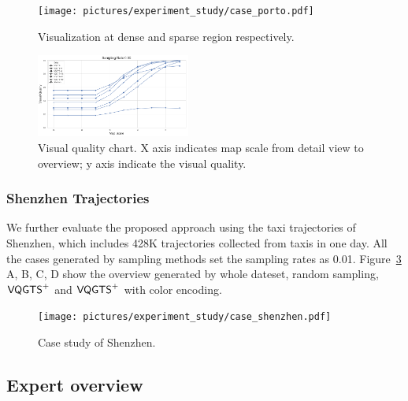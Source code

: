 \begin{figure}[t]
	\centering
	\vspace{2mm}
	\texttt{[image: pictures/experiment\_study/case\_porto.pdf]}
	\caption{Visualization at dense and sparse region respectively.}
	\vspace{0mm}
	\label{fig:porto}
\end{figure}

\begin{figure}[t]
	\centering
	\vspace{2mm}
	\includegraphics[width=0.45\textwidth]{pictures/experiment_study/quanlity.png}
	\caption{Visual quality chart. X axis indicates map scale from detail view to overview; y axis indicate the visual quality. }
	\vspace{0mm}
	\label{fig:quality_chart}
\end{figure}


\subsubsection{Shenzhen Trajectories}
We further evaluate the proposed approach using the taxi trajectories of Shenzhen, which includes 428K trajectories collected from \QM{**} taxis in one day. All the cases generated by sampling methods set the sampling rates as 0.01. Figure~\ref{fig:shenzhen} A, B, C, D show the overview generated by whole dateset, random sampling, $\mathsf{VQGTS}^{+}$ and $\mathsf{VQGTS}^{+}$ with color encoding. 

\begin{figure}[t]
	\centering
	\vspace{2mm}
	\texttt{[image: pictures/experiment\_study/case\_shenzhen.pdf]}
	\caption{Case study of Shenzhen.}
	\vspace{0mm}
	\label{fig:shenzhen}
\end{figure}



\subsection{Expert overview}

